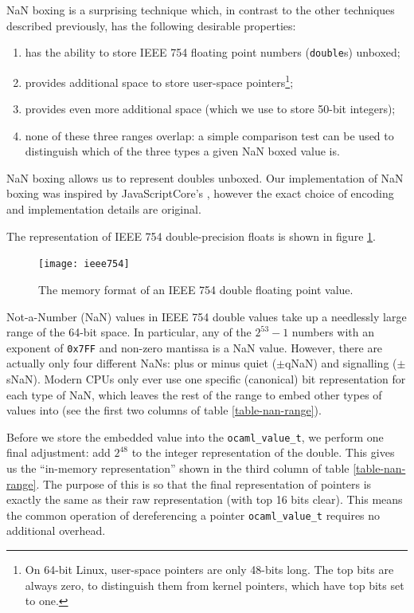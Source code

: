 \documentclass[12pt,a4paper,twoside,openright]{report}
\begin{document}
NaN boxing is a surprising technique which, in contrast to the other
techniques described previously, has the following desirable properties:
\begin{enumerate}
    \item has the ability to store IEEE 754 floating point numbers (\lstinline!double!s) unboxed;
    \item provides additional space to store user-space pointers\footnote{On 64-bit
      Linux, user-space pointers are only 48-bits long. The top bits are always
      zero, to distinguish them from kernel pointers, which have top bits set to
      one.};
    \item provides even more additional space (which we use to store 50-bit integers);
    \item none of these three ranges overlap: a simple comparison test can be
      used to distinguish which of the three types a given NaN boxed value is.
\end{enumerate}

NaN boxing allows us to represent doubles unboxed. Our implementation of NaN
boxing was inspired by JavaScriptCore's \cite{jscore}, however the exact choice
of encoding and implementation details are original.

The representation of IEEE 754 double-precision floats is shown in figure \ref{fig-ieee754}.
\begin{figure}[h]
  \centering
  \texttt{[image: ieee754]}
  \caption{The memory format of an IEEE 754 double floating point value.}
  \label{fig-ieee754}
\end{figure}

Not-a-Number (NaN) values in IEEE 754 double values take
up a needlessly large range of the 64-bit space. In
particular, any of the $2^{53}-1$ numbers with an exponent of \texttt{0x7FF} and
non-zero mantissa is a NaN value. However, there are actually only four
different NaNs: plus or minus quiet ($\pm$qNaN) and signalling ($\pm$sNaN).
Modern CPUs only ever use one specific (canonical) bit representation for each
type of NaN, which leaves the rest of the range to embed other types of values
into (see the first two columns of table \ref{table-nan-range}).

Before we store the embedded value into the \lstinline!ocaml_value_t!, we perform
one final adjustment: add $2^{48}$ to the integer representation of the double. This
gives us the ``in-memory representation'' shown in the third column of table
\ref{table-nan-range}. The purpose of this is so that the final representation
of pointers is exactly the same as their raw representation (with top 16 bits clear).
This means the common operation of dereferencing a pointer \lstinline!ocaml_value_t!
requires no additional overhead.
\end{document}
